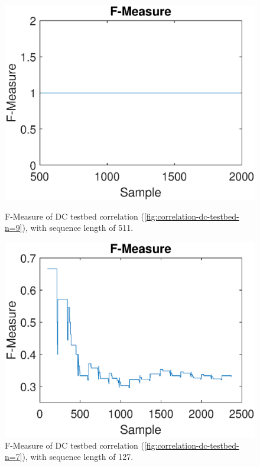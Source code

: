 \begin{figure}[!tbp]
  \centering
  \begin{minipage}[b]{0.49\textwidth}
    \includegraphics[width=\textwidth]{chapters/evaluation-chapters/hardware/dc/f-measure-dc-testbed-n=9.eps}
	\caption{F-Measure of DC testbed correlation (\autoref{fig:correlation-dc-testbed-n=9}), with sequence length of 511.}
	\label{fig:f-measure-dc-testbed-n=9}
  \end{minipage}
  \hfill
  \begin{minipage}[b]{0.49\textwidth}
	\includegraphics[width=\textwidth]{chapters/evaluation-chapters/hardware/dc/f-measure-dc-testbed-n=7.eps}
	\caption{F-Measure of DC testbed correlation (\autoref{fig:correlation-dc-testbed-n=7}), with sequence length of 127.}
	\label{fig:f-measure-dc-testbed-n=7}
  \end{minipage}
\end{figure}